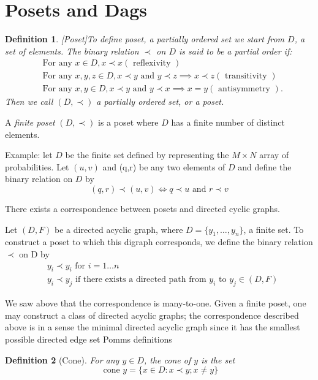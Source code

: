 \documentclass[11pt]{amsart}
\newtheorem{definition}{Definition}
\begin{document}
\newpage
\section{Posets and Dags}
\begin{definition}\label{def:Poset}[Poset]To define poset, a partially ordered set we start from $D$, a set of elements. The binary relation $\prec$ on $D$ is said to be a partial order if:
\begin{align}
&\text{For any } x \in D, x \prec x (\text{ reflexivity }) \\
&\text{For any } x,y,z \in D, x \prec y \text{ and } y \prec z \implies x \prec z (\text{ transitivity }) \\
&\text{For any } x, y \in D, x \prec y \text{ and } y \prec x \implies x = y (\text{ antisymmetry }).
\end{align}
Then we call $(D, \prec)$ a partially ordered set, or a \textit{poset}. 
\end{definition}

A \textit{finite poset} $(D,\prec)$ is a poset where $D$ has a finite number of distinct elements. 

Example: let $D$ be the finite set defined by representing the $M \times N$ array of probabilities. Let $(u,v)$ and (q,r) be any two elements of $D$ and define the binary relation on $D$ by
\begin{equation}
(q,r) \prec (u,v) \iff q \prec u \text{ and } r \prec v
\end{equation}

There exists a correspondence between posets and directed cyclic graphs. 

Let $(D, F)$ be a directed acyclic graph, where $D = \{y_1, \ldots, y_n\}$, a finite set. To construct a poset to which this digraph corresponds, we define the binary relation $\prec$ on D by
\begin{align}
&y_i \prec y_i \text{ for } i= 1\dots n \\ 
&y_i \prec y_j \text{ if there exists a directed path from } y_i \text{ to } y_j \in (D,F)
\end{align}

We saw above that the correspondence is many-to-one. Given a finite poset, one may construct a class of directed acyclic graphs; the correspondence described above is in a sense the minimal directed acyclic graph since it has the smallest possible directed edge set
Pomms definitions 


\begin{definition}[Cone]
For any $y \in D$, the \textit{cone} of $y$ is the set
\begin{equation}
\text{ cone } y = \{x \in D: x\prec y;x\neq y \} \nonumber
\end{equation}
\end{definition}
\end{document}
